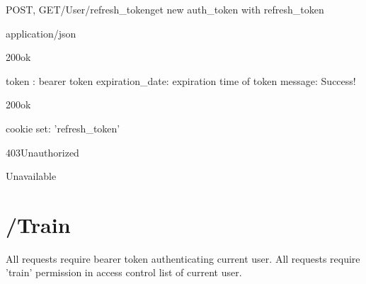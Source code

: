 \documentclass[12pt, etter]{article}
\begin{document}
\begin{apiRoute}{POST, GET}{/User/refresh\_token}{get new auth\_token with refresh\_token}
    \begin{routeParameter}
    \end{routeParameter}
    \begin{routeResponse}{application/json}
        \begin{routeResponseItem}{200}{ok}
            \begin{routeResponseItemBody}
                token : bearer token
                expiration_date: expiration time of token
                message: Success!
            \end{routeResponseItemBody}
        \end{routeResponseItem}
        \begin{routeResponseItem}{200}{ok}
            \begin{routeResponseItemBody}
                cookie set: 'refresh_token'
            \end{routeResponseItemBody}   
        \end{routeResponseItem}
        \begin{routeResponseItem}{403}{Unauthorized}
            \begin{routeResponseItemBody}
                Unavailable
            \end{routeResponseItemBody}
        \end{routeResponseItem}
    \end{routeResponse}
\end{apiRoute}


\section{/Train}
All requests require bearer token authenticating current user.
All requests require 'train' permission in access control list of current user.
\end{document}
